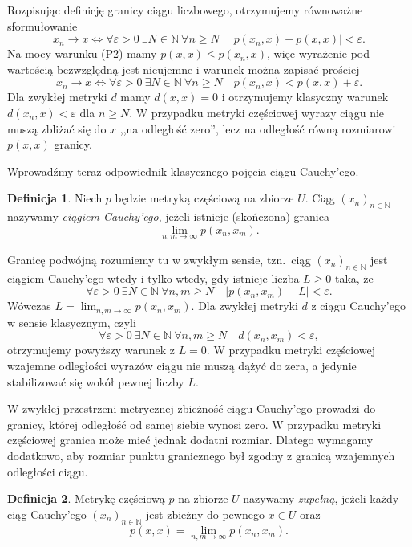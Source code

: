 \documentclass[11pt,a4paper]{article}
\theoremstyle{definition}
\newtheorem{definicja}{Definicja}[section]
\theoremstyle{plain}
\begin{document}
Rozpisując definicję granicy ciągu liczbowego, otrzymujemy równoważne
sformułowanie
\[
x_n\longrightarrow x
\iff
\forall\varepsilon>0\ \exists N\in\mathbb N\ \forall n\geq N\quad
\big|p(x_n,x)-p(x,x)\big|<\varepsilon.
\]
Na mocy warunku (P2) mamy $p(x,x)\leq p(x_n,x)$, więc wyrażenie pod
wartością bezwzględną jest nieujemne i warunek można zapisać prościej
\[
x_n\longrightarrow x
\iff
\forall\varepsilon>0\ \exists N\in\mathbb N\ \forall n\geq N\quad
p(x_n,x)<p(x,x)+\varepsilon.
\]
Dla zwykłej metryki $d$ mamy $d(x,x)=0$ i otrzymujemy klasyczny warunek
$d(x_n,x)<\varepsilon$ dla $n\geq N$. W przypadku metryki częściowej
wyrazy ciągu nie muszą zbliżać się do $x$ ,,na odległość zero'', lecz na
odległość równą rozmiarowi $p(x,x)$ granicy.

Wprowadźmy teraz odpowiednik klasycznego pojęcia ciągu Cauchy'ego.

\begin{definicja}\label{def:cauchy_pmetryka}
	Niech $p$ będzie metryką częściową na zbiorze $U$. Ciąg
	$(x_n)_{n\in\mathbb{N}}$ nazywamy \emph{ciągiem Cauchy'ego}, jeżeli
	istnieje (skończona) granica
	\[
	\lim_{n,m\to\infty}p(x_n,x_m).
	\]
\end{definicja}

Granicę podwójną rozumiemy tu w zwykłym sensie, tzn.\ ciąg
$(x_n)_{n\in\mathbb N}$ jest ciągiem Cauchy'ego wtedy i tylko wtedy, gdy
istnieje liczba $L\geq0$ taka, że
\[
\forall\varepsilon>0\ \exists N\in\mathbb N\ \forall n,m\geq N\quad
\big|p(x_n,x_m)-L\big|<\varepsilon.
\]
Wówczas $L=\lim_{n,m\to\infty}p(x_n,x_m)$. Dla zwykłej metryki $d$
z ciągu Cauchy'ego w sensie klasycznym, czyli
\[
\forall\varepsilon>0\ \exists N\in\mathbb N\ \forall n,m\geq N\quad
d(x_n,x_m)<\varepsilon,
\]
otrzymujemy powyższy warunek z $L=0$. W przypadku metryki częściowej
wzajemne odległości wyrazów ciągu nie muszą dążyć do zera, a jedynie
stabilizować się wokół pewnej liczby $L$.

W zwykłej przestrzeni metrycznej zbieżność ciągu Cauchy'ego prowadzi do
granicy, której odległość od samej siebie wynosi zero. W przypadku
metryki częściowej granica może mieć jednak dodatni rozmiar. Dlatego
wymagamy dodatkowo, aby rozmiar punktu granicznego był zgodny z granicą
wzajemnych odległości ciągu.

\begin{definicja}\label{def:zupelnosc_pmetryka}
	Metrykę częściową $p$ na zbiorze $U$ nazywamy \emph{zupełną}, jeżeli
	każdy ciąg Cauchy'ego $(x_n)_{n\in\mathbb{N}}$ jest zbieżny do pewnego
	$x\in U$ oraz
	\[
	p(x,x)
	=
	\lim_{n,m\to\infty}p(x_n,x_m).
	\]
\end{definicja}
\end{document}
